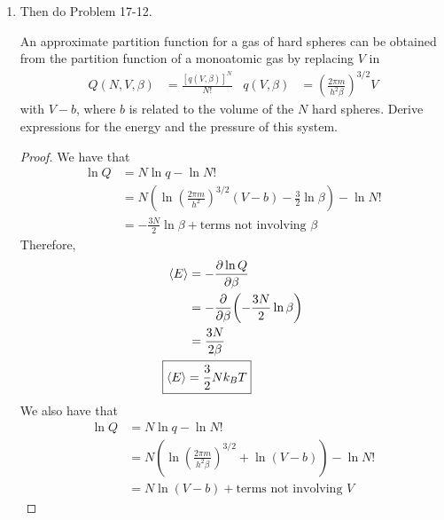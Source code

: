 \documentclass[../psets.tex]{subfiles}
\begin{document}
\begin{enumerate}
\begin{enumerate}
\begin{proof}
\begin{align*}
                &= k_BT\pdv{V}(N\ln(V-Nb)+\frac{aN^2}{Vk_BT})\\
                &= k_BT\left[ \frac{N}{V-Nb}-\frac{a}{k_BT}\left( \frac{N}{V} \right)^2 \right]\\
                &= \frac{Nk_BT}{V-Nb}-a\left( \frac{N}{V} \right)^2\\
                \left( P+\frac{aN^2}{V^2} \right)(V-Nb) &= Nk_BT
            \end{align*}
            as desired.
        \end{proof}
        \item Then do Problem 17-12.\par
        An approximate partition function for a gas of hard spheres can be obtained from the partition function of a monoatomic gas by replacing $V$ in
        \begin{align*}
            Q(N,V,\beta) &= \frac{[q(V,\beta)]^N}{N!}&
            q(V,\beta) &= \left( \frac{2\pi m}{h^2\beta} \right)^{3/2}V
        \end{align*}
        with $V-b$, where $b$ is related to the volume of the $N$ hard spheres. Derive expressions for the energy and the pressure of this system.
        \begin{proof}
            We have that
            \begin{align*}
                \ln Q &= N\ln q-\ln N!\\
                &= N\left( \ln\left( \frac{2\pi m}{h^2} \right)^{3/2}(V-b)-\frac{3}{2}\ln\beta \right)-\ln N!\\
                &= -\frac{3N}{2}\ln\beta+\text{terms not involving }\beta
            \end{align*}
            Therefore,
            \begin{align*}
                \prb{E} &= -\pdv{\ln Q}{\beta}\\
                &= -\pdv{\beta}(-\frac{3N}{2}\ln\beta)\\
                &= \frac{3N}{2\beta}\\
                \Aboxed{\prb{E} &= \frac{3}{2}Nk_BT}
            \end{align*}
            We also have that
            \begin{align*}
                \ln Q &= N\ln q-\ln N!\\
                &= N\left( \ln\left( \frac{2\pi m}{h^2\beta} \right)^{3/2}+\ln(V-b) \right)-\ln N!\\
                &= N\ln(V-b)+\text{terms not involving }V

\end{align*}
\end{proof}
\end{enumerate}
\end{enumerate}
\end{document}

